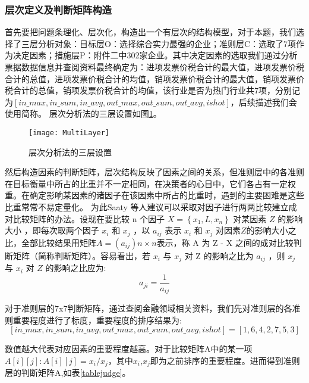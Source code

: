 \documentclass{cumcmthesis}
\begin{document}
\subsubsection{层次定义及判断矩阵构造}
首先要把问题条理化、层次化，构造出一个有层次的结构模型，对于本题，我们选择了三层分析对象：目标层O：选择综合实力最强的企业；准则层C：选取了7项作为决定因素；措施层P：附件二中302家企业。其中决定因素的选取我们通过分析票据数据信息并查阅资料最终确定为：进项发票价税合计的最大值，进项发票价税合计的总值，进项发票价税合计的均值，销项发票价税合计的最大值，销项发票价税合计的总值，销项发票价税合计的均值，该行业是否为热门行业共7项，分别记为$\left[ in\_max,in\_sum,in\_avg,out\_max,out\_sum,out\_avg,ishot \right] $，后续描述我们会使用简称。
层次分析法的三层设置如图\ref{MultiLayer}。
\begin{figure}[H]
    \centering
    \texttt{[image: MultiLayer]}
    \caption{层次分析法的三层设置}
    \label{MultiLayer}
\end{figure}

然后构造因素的判断矩阵，层次结构反映了因素之间的关系，但准则层中的各准则在目标衡量中所占的比重并不一定相同，在决策者的心目中，它们各占有一定权重。在确定影响某因素的诸因子在该因素中所占的比重时，遇到的主要困难是这些比重常常不易定量化。 为此Saaty 等人建议可以采取对因子进行两两比较建立成对比较矩阵的办法。设现在要比较 n 个因子 $X = \left\{ x_1,L, x_n \right\} $ 对某因素 $Z$ 的影响大小 ，即每次取两个因子 $x_i$ 和 $x_j$ ，以 $a_{ij}$ 表示 $x_i$ 和 $x_j$ 对因素$Z$的影响大小之比，全部比较结果用矩阵$A = (a_{ij} )n \times n $表示，称 A 为 Z - X 之间的成对比较判断矩阵（简称判断矩阵）。容易看出，若 $x_i$ 与 $x_j$ 对 Z 的影响之比为 $a_{ij}$ ，则 $x_j$ 与 $x_i$ 对 $Z$ 的影响之比应为:
\begin{equation}
    a_{ji} = \frac{1}{a_{ij}}
\end{equation}

对于准则层的7x7判断矩阵，通过查阅金融领域相关资料，我们先对准则层的各准则重要程度进行了标度，重要程度的排序结果为:$$\left[ in\_max,in\_sum,in\_avg,out\_max,out\_sum,out\_avg,ishot\right]=[1,6,4,2,7,5,3]$$

数值越大代表对应因素的重要程度越高。对于比较矩阵A中的某一项$A\left[i\right]\left[j\right]:A\left[i\right]\left[j\right]=x_i/x_j$，其中$x_i$,$x_j$即为之前排序的重要程度。进而得到准则层的判断矩阵A,如表\ref{tablejudge}。
\end{document}
